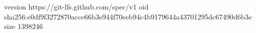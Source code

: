 version https://git-lfs.github.com/spec/v1
oid sha256:e0df9f3272870acce66b3e944f70eeb94c4b9179644a43701295dc67490d6b3e
size 1398246
